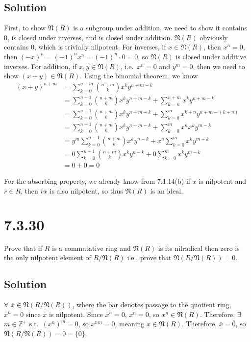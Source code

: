 \documentclass[fleqn]{article}
\begin{document}
        \subsection{Solution}
        First, to show $\mathfrak{N}(R)$ is a subgroup under addition, we need to show it contains 0, is closed under inverses, and is closed under addition.  $\mathfrak{N}(R)$ obviously contains 0, which is trivially nilpotent.  For inverses, if $x \in \mathfrak{N}(R)$, then $x^n = 0$, then $(-x)^n = (-1)^n x^n = (-1)^n \cdot 0 = 0$, so $\mathfrak{N}(R)$ is closed under additive inverses.  For addition, if $x, y \in \mathfrak{N}(R)$, i.e.\ $x^n = 0$ and $y^m = 0$, then we need to show $(x + y) \in \mathfrak{N}(R)$.  Using the binomial theorem, we know
        \begin{align}
            (x + y)^{n + m} &= \sum\limits_{k = 0}^{n + m} \binom{n + m}{k} x^k y^{n + m - k} \\
                &= \sum\limits_{k = 0}^{n - 1} \binom{n + m}{k} x^k y^{n + m - k} + \sum\limits_{k = n}^{n + m} x^k y^{n + m - k} \\
                &= \sum\limits_{k = 0}^{n - 1} \binom{n + m}{k} x^k y^{n + m - k} + \sum\limits_{k = 0}^{m} x^{k + n} y^{n + m - (k + n)} \\
                &= \sum\limits_{k = 0}^{n - 1} \binom{n + m}{k} x^k y^{n + m - k} + \sum\limits_{k = 0}^{m} x^n x^k y^{m - k} \\
                &= y^m \sum\limits_{k = 0}^{n - 1} \binom{n + m}{k} x^k y^{n - k} + x^n \sum\limits_{k = 0}^{m} x^k y^{m - k} \\
                &= 0 \sum\limits_{k = 0}^{n - 1} \binom{n + m}{k} x^k y^{n - k} + 0 \sum\limits_{k = 0}^{m} x^k y^{m - k} \\
                &= 0 + 0 = 0
        \end{align}
        
        For the absorbing property, we already know from 7.1.14(b) if $x$ is nilpotent and $r \in R$, then $rx$ is also nilpotent, so thus $\mathfrak{N}(R)$ is an ideal.
    
    \section{7.3.30}
    Prove that if $R$ is a commutative ring and $\mathfrak{N}(R)$ is its nilradical then zero is the only nilpotent element of $R/\mathfrak{N}(R)$ i.e., prove that $\mathfrak{N}({R/\mathfrak{N}(R)}) = 0$.
        
        \subsection{Solution}
        $\forall$ $\overline{x} \in \mathfrak{N}(R/\mathfrak{N}(R))$, where the bar denotes passage to the quotient ring, $\overline{x}^n = \overline{0}$ since $\overline{x}$ is nilpotent.  Since $\overline{x}^n = \overline{0}$, $\overline{x^n} = 0$, so $x^n \in \mathfrak{N}(R)$.  Therefore, $\exists$ $m \in \mathbb{Z}^+$ s.t.\ $(x^n)^m = 0$, so $x^{nm} = 0$, meaning $x \in \mathfrak{N}(R)$.  Therefore, $\overline{x} = \overline{0}$, so $\mathfrak{N}(R/\mathfrak{N}(R)) = 0 = \{\overline{0}\}$.
    
\end{document}
